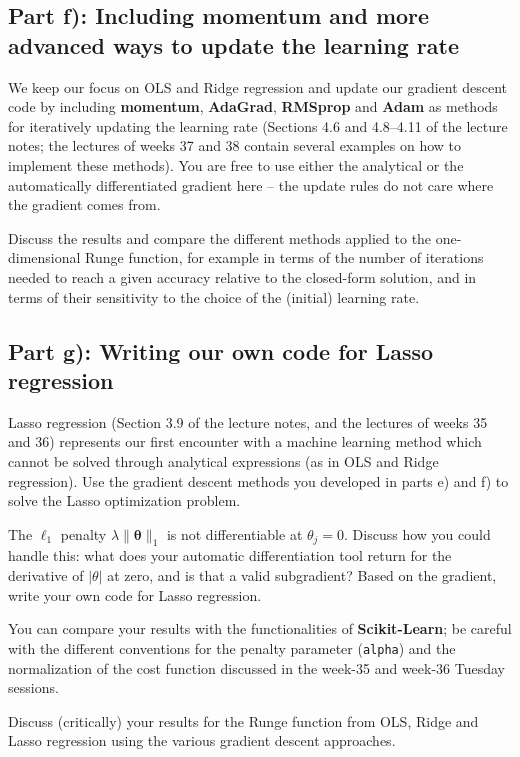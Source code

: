 \documentclass[11pt,a4paper]{article}
\begin{document}
\subsection*{Part f): Including momentum and more advanced ways to update the learning rate}

We keep our focus on OLS and Ridge regression and update our gradient descent
code by including \textbf{momentum}, \textbf{AdaGrad}, \textbf{RMSprop} and
\textbf{Adam} as methods for iteratively updating the learning rate
(Sections 4.6 and 4.8--4.11 of the lecture notes; the lectures of weeks 37
and 38 contain several examples on how to implement these methods).  You are
free to use either the analytical or the automatically differentiated
gradient here -- the update rules do not care where the gradient comes from.

Discuss the results and compare the different methods applied to the
one-dimensional Runge function, for example in terms of the number of
iterations needed to reach a given accuracy relative to the closed-form
solution, and in terms of their sensitivity to the choice of the (initial)
learning rate.

\subsection*{Part g): Writing our own code for Lasso regression}

Lasso regression (Section 3.9 of the lecture notes, and the lectures of weeks
35 and 36) represents our first encounter with a machine learning method
which cannot be solved through analytical expressions (as in OLS and Ridge
regression).  Use the gradient descent methods you developed in parts e) and
f) to solve the Lasso optimization problem.

The $\ell_1$ penalty $\lambda\|\bm{\theta}\|_1$ is not differentiable at
$\theta_j=0$.  Discuss how you could handle this: what does your automatic
differentiation tool return for the derivative of $|\theta|$ at zero, and is
that a valid subgradient? Based on the gradient, write your own code for Lasso regression.

You can compare your results with the functionalities of
\textbf{Scikit-Learn}; be careful with the different conventions for the
penalty parameter (\texttt{alpha}) and the normalization of the cost function
discussed in the week-35 and week-36 Tuesday sessions.

Discuss (critically) your results for the Runge function from OLS, Ridge and
Lasso regression using the various gradient descent approaches.
\end{document}
